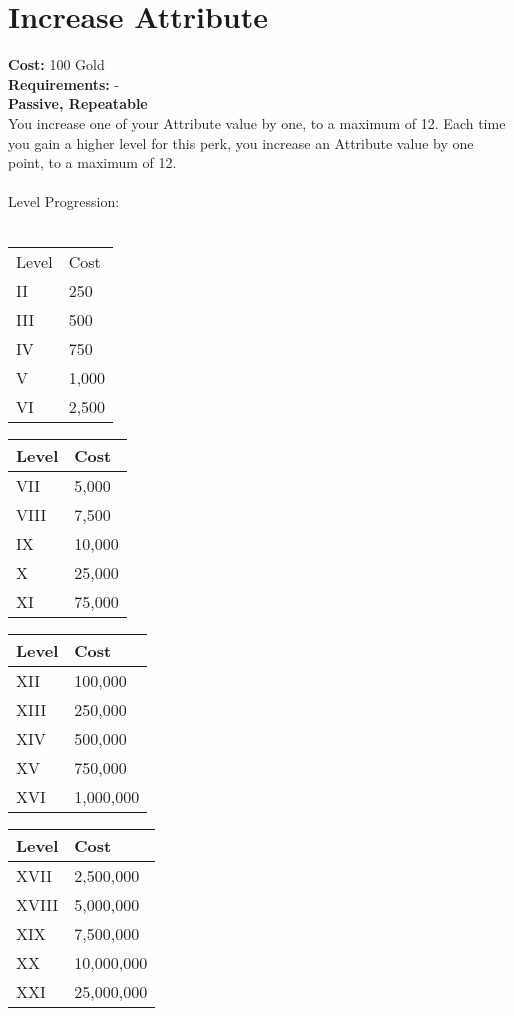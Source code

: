 \section{Increase Attribute}\label{sec:increaseattribute}
\textbf{Cost:} 100 Gold\\
\textbf{Requirements:} -\\
\textbf{Passive, Repeatable}\\
You increase one of your Attribute value by one, to a maximum of 12.
Each time you gain a higher level for this perk, you increase an Attribute value by one point, to a maximum of 12.\\
\\
Level Progression:\\
\\
\begin{minipage}{0.22\textwidth}
	\begin{tabular}{l | l}
		Level & Cost\\
		II & 250\\
		III & 500\\
		IV & 750\\
		V & 1,000\\
		VI & 2,500\\
	\end{tabular}
\end{minipage}
\begin{minipage}{0.22\textwidth}
	\begin{tabular}{l | l}
		Level & Cost\\ \hline
		VII & 5,000\\
		VIII & 7,500\\
		IX & 10,000\\
		X & 25,000\\
		XI & 75,000\\
	\end{tabular}
\end{minipage}
\begin{minipage}{0.22\textwidth}
	\begin{tabular}{l | l}
		Level & Cost\\ \hline
		XII & 100,000\\
		XIII & 250,000\\
		XIV & 500,000\\
		XV & 750,000\\
		XVI & 1,000,000\\
	\end{tabular}
\end{minipage}
\begin{minipage}{0.22\textwidth}
	\begin{tabular}{l | l}
		Level & Cost\\ \hline
		XVII & 2,500,000\\
		XVIII & 5,000,000\\
		XIX & 7,500,000\\
		XX & 10,000,000\\
		XXI & 25,000,000\\
	\end{tabular}
\end{minipage}